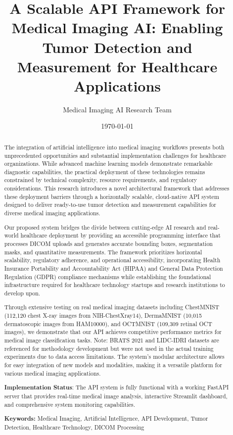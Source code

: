 \documentclass[12pt,a4paper]{article}
\title{\textbf{A Scalable API Framework for Medical Imaging AI: Enabling Tumor Detection and Measurement for Healthcare Applications}}
\author{
    Medical Imaging AI Research Team
}
\date{\today}
\begin{document}
\maketitle

\begin{abstract}
The integration of artificial intelligence into medical imaging workflows presents both unprecedented opportunities and substantial implementation challenges for healthcare organizations. While advanced machine learning models demonstrate remarkable diagnostic capabilities, the practical deployment of these technologies remains constrained by technical complexity, resource requirements, and regulatory considerations. This research introduces a novel architectural framework that addresses these deployment barriers through a horizontally scalable, cloud-native API system designed to deliver ready-to-use tumor detection and measurement capabilities for diverse medical imaging applications.

Our proposed system bridges the divide between cutting-edge AI research and real-world healthcare deployment by providing an accessible programming interface that processes DICOM uploads and generates accurate bounding boxes, segmentation masks, and quantitative measurements. The framework prioritizes horizontal scalability, regulatory adherence, and operational accessibility, incorporating Health Insurance Portability and Accountability Act (HIPAA) and General Data Protection Regulation (GDPR) compliance mechanisms while establishing the foundational infrastructure required for healthcare technology startups and research institutions to develop upon.

Through extensive testing on real medical imaging datasets including ChestMNIST (112,120 chest X-ray images from NIH-ChestXray14), DermaMNIST (10,015 dermatoscopic images from HAM10000), and OCTMNIST (109,309 retinal OCT images), we demonstrate that our API achieves competitive performance metrics for medical image classification tasks. Note: BRATS 2021 and LIDC-IDRI datasets are referenced for methodology development but were not used in the actual training experiments due to data access limitations. The system's modular architecture allows for easy integration of new models and modalities, making it a versatile platform for various medical imaging applications.

\textbf{Implementation Status}: The API system is fully functional with a working FastAPI server that provides real-time medical image analysis, interactive Streamlit dashboard, and comprehensive system monitoring capabilities.

\textbf{Keywords:} Medical Imaging, Artificial Intelligence, API Development, Tumor Detection, Healthcare Technology, DICOM Processing
\end{abstract}
\end{document}
